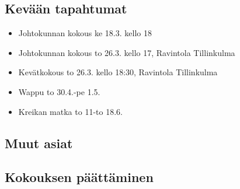 \documentclass[a4paper,12pt]{article}
\begin{document}
\subsection{Kevään tapahtumat}
\begin{itemize}
\item{Johtokunnan kokous} ke 18.3. kello 18
\item{Johtokunnan kokous} to 26.3. kello 17, Ravintola Tillinkulma
\item{Kevätkokous} to 26.3. kello 18:30, Ravintola Tillinkulma
\item{Wappu} to 30.4.-pe 1.5.
\item{Kreikan matka} to 11-to 18.6.
\end{itemize}
\subsection{Muut asiat}
\subsection{Kokouksen päättäminen}
\end{document}
